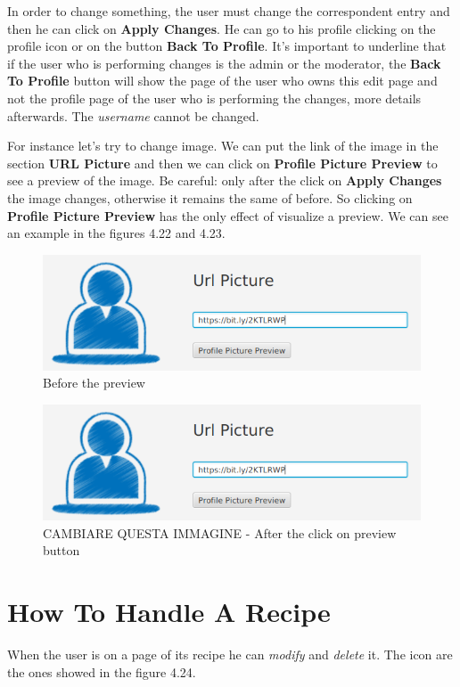 \documentclass[a4paper]{report}
\begin{document}
\noindent In order to change something, the user must change the correspondent entry and then he can click on \textbf{Apply Changes}. He can go to his profile clicking on the profile icon or on the button \textbf{Back To Profile}. It's important to underline that if the user who is performing changes is the admin or the moderator, the \textbf{Back To Profile} button will show the page of the user who owns this edit page and not the profile page of the user who is performing the changes, more details afterwards. The \emph{username} cannot be changed.

\noindent For instance let's try to change image. We can put the link of the image in the section \textbf{URL Picture} and then we can click on \textbf{Profile Picture Preview} to see a preview of the image. Be careful: only after the click on \textbf{Apply Changes} the image changes, otherwise it remains the same of before. So clicking on \textbf{Profile Picture Preview} has the only effect of visualize a preview. We can see an example in the figures 4.22 and 4.23.

\begin{figure}[htpb]
	\centering
	\includegraphics[scale=0.3]{img/user_manual/before-click.png}
	\caption{Before the preview}
\end{figure}

\begin{figure}[htpb]
	\centering
	\includegraphics[scale=0.3]{img/user_manual/before-click.png}
	\caption{CAMBIARE QUESTA IMMAGINE - After the click on preview button}
\end{figure}

\section{How To Handle A Recipe}
When the user is on a page of its recipe he can \emph{modify} and \emph{delete} it. The icon are the ones showed in the figure 4.24.
\end{document}
